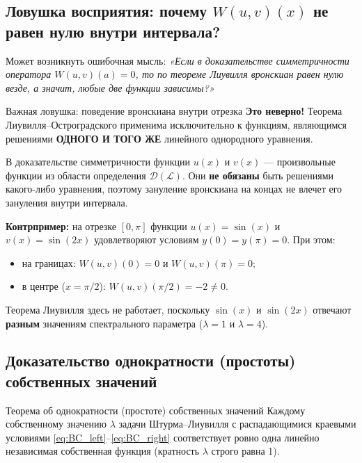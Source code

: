 \documentclass[12pt,a4paper]{article}
\begin{document}
\subsection{Ловушка восприятия: почему $W(u, v)(x)$ не равен нулю внутри интервала?}
\label{subsec:trap}


Может возникнуть ошибочная мысль: \textit{«Если в доказательстве симметричности оператора $W(u, v)(a) = 0$, то по теореме Лиувилля вронскиан равен нулю везде, а значит, любые две функции зависимы?»}

\begin{warningbox}{Важная ловушка: поведение вронскиана внутри отрезка}
\textbf{Это неверно!} Теорема Лиувилля--Остроградского применима исключительно к функциям, являющимся решениями \textbf{ОДНОГО И ТОГО ЖЕ} линейного однородного уравнения. 

В доказательстве симметричности функции $u(x)$ и $v(x)$ — произвольные функции из области определения $\mathcal{D}(\mathcal{L})$. Они \textbf{не обязаны} быть решениями какого-либо уравнения, поэтому зануление вронскиана на концах не влечет его зануления внутри интервала.

\end{warningbox}

\textbf{Контрпример:} на отрезке $[0, \pi]$ функции $u(x) = \sin(x)$ и $v(x) = \sin(2x)$ удовлетворяют условиям $y(0)=y(\pi)=0$. При этом:
\begin{itemize}
    \item на границах: $W(u, v)(0) = 0$ и $W(u, v)(\pi) = 0$;
    \item в центре ($x = \pi/2$): $W(u, v)(\pi/2) = -2 \neq 0$.
\end{itemize}
Теорема Лиувилля здесь не работает, поскольку $\sin(x)$ и $\sin(2x)$ отвечают \textbf{разным} значениям спектрального параметра ($\lambda = 1$ и $\lambda = 4$).


\subsection{Доказательство однократности (простоты) собственных значений}

\begin{theorybox}{Теорема об однократности (простоте) собственных значений}
Каждому собственному значению $\lambda$ задачи Штурма--Лиувилля с распадающимися краевыми условиями \eqref{eq:BC_left}--\eqref{eq:BC_right} соответствует ровно одна линейно независимая собственная функция (кратность $\lambda$ строго равна 1).
\end{theorybox}
\end{document}
